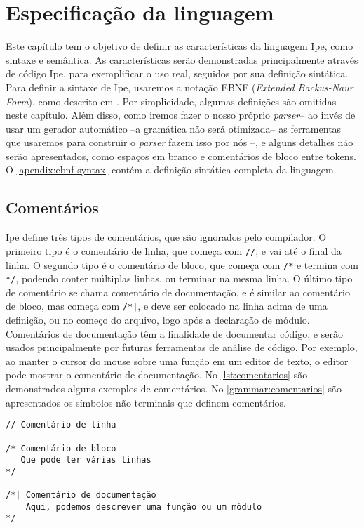 
\chapter{Especificação da linguagem}\label{chapter:specification}

Este capítulo tem o objetivo de definir as características da linguagem Ipe, como
sintaxe e semântica. As características serão demonstradas principalmente através
de código Ipe, para exemplificar o uso real, seguidos por sua definição sintática.
Para definir a sintaxe de Ipe, usaremos a notação EBNF (\textit{Extended Backus-Naur Form}),
como descrito em \cite{ebnfstandard}. Por simplicidade, algumas definições são
omitidas neste capítulo. Além disso, como iremos fazer o nosso próprio
\textit{parser}-- ao invés de usar um gerador automático --a gramática não será
otimizada-- as ferramentas que usaremos para construir o \textit{parser} fazem
isso por nós --, e alguns detalhes não serão apresentados, como espaços em branco
e comentários de bloco entre tokens. O \autoref{apendix:ebnf-syntax} contém a
definição sintática completa da linguagem.

\section{Comentários}

Ipe define três tipos de comentários, que são ignorados pelo compilador. O primeiro
tipo é o comentário de linha, que começa com \texttt{//}, e vai até o final da linha.
O segundo tipo é o comentário de bloco, que começa com \texttt{/*} e termina com
\texttt{*/}, podendo conter múltiplas linhas, ou terminar na mesma linha. O último
tipo de comentário se chama comentário de documentação, e é similar ao comentário
de bloco, mas começa com \texttt{/*|}, e deve ser colocado na linha acima de uma
definição, ou no começo do arquivo, logo após a declaração de módulo. Comentários
de documentação têm a finalidade de documentar código, e serão usados principalmente por
futuras ferramentas de análise de código. Por exemplo, ao manter o cursor do
mouse sobre uma função em um editor de texto, o editor pode mostrar o comentário
de documentação. No \autoref{lst:comentarios} são demonstrados alguns exemplos
de comentários. No \autoref{grammar:comentarios} são apresentados os símbolos
não terminais que definem comentários.

\begin{lstlisting}[label={lst:comentarios},caption={Exemplos de comentários}]
// Comentário de linha

/* Comentário de bloco
   Que pode ter várias linhas
*/

/*| Comentário de documentação
    Aqui, podemos descrever uma função ou um módulo 
*/
\end{lstlisting}

